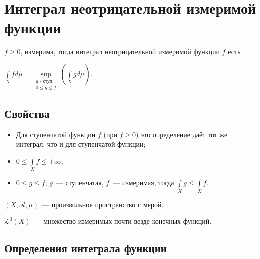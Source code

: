 \documentclass{article}
\begin{document}
    \newpage
    
    \section{Интеграл неотрицательной измеримой функции}
    
        $f \geqslant 0$, измерима, тогда интеграл неотрицательной измеримой функции $f$ есть
        
        $\int\limits_{X} f d \mu = \sup\limits_{\substack{\text{$g$ - ступ.} \\ 0 \leqslant g \leqslant f}} \left( \int\limits_{X} g d \mu \right)$.
            
        \subsection{Свойства}
                
            \begin{itemize}
                
                \item Для ступенчатой функции $f$ (при $f \geqslant 0$) это определение даёт тот же интеграл, что и для ступенчатой функции;
                    
                \item $0 \leqslant \int\limits_{X} f \leqslant +\infty$;
                    
                \item $0 \leqslant g \leqslant f$, $g$~--- ступенчатая, $f$~--- измеримая, тогда $\int\limits_{X} g \leqslant \int\limits_{X} f$.
                    
            \end{itemize}
                
    \newpage
                
    $(X, \mathcal{A}, \mu)$~--- произвольное пространство с мерой.
    
    $\mathcal{L}^0 (X)$~--- множество измеримых почти везде конечных функций.
    
    \subsection{Определения интеграла функции}
    
\end{document}

